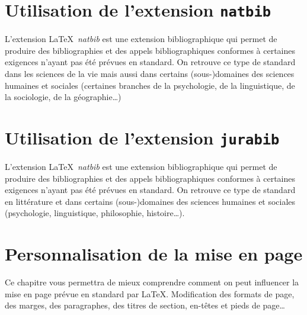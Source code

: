 


\chapter{Utilisation de l'extension \texttt{natbib}}
\label{cha:natbib}
\begin{center}
  \begin{minipage}[r]{0.5\linewidth}
    L'extension \LaTeX\ \emph{natbib} est une extension
    bibliographique qui permet de produire des bibliographies et des
    appels bibliographiques conformes à certaines exigences n'ayant
    pas été prévues en standard. On retrouve ce type de \og standard
    \fg dans les sciences de la vie mais aussi dans certains
    (sous-)domaines des sciences humaines et sociales (certaines
    branches de la psychologie, de la linguistique, de la sociologie,
    de la géographie\ldots)
  \end{minipage}
\end{center}




 \chapter{Utilisation de l'extension \texttt{jurabib}}
 \label{cha:jurabib}
 \begin{center}
   \begin{minipage}[r]{0.5\linewidth}
     L'extension \LaTeX\ \emph{natbib} est une extension
     bibliographique qui permet de produire des bibliographies et des
     appels bibliographiques conformes à certaines exigences n'ayant
     pas été prévues en standard. On retrouve ce type de \og standard
     \fg en littérature et dans certains (sous-)domaines des sciences
     humaines et sociales (psychologie, linguistique, philosophie,
     histoire\ldots).

   \end{minipage}
 \end{center}

 


\chapter{Personnalisation de la mise en page}
\label{cha:personnalisation}
\begin{center}
  \begin{minipage}[r]{0.5\linewidth}
    Ce chapitre vous permettra de mieux comprendre comment on peut
    influencer la mise en page prévue en standard par
    \LaTeX. Modification des formats de page, des marges, des
    paragraphes, des titres de section, en-têtes et pieds de
    page\ldots
  \end{minipage}
\end{center}

